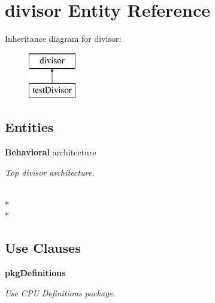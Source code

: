 \section{divisor Entity Reference}
\label{classdivisor}
Inheritance diagram for divisor\-:\begin{figure}[H]
\begin{center}
\leavevmode
\includegraphics[height=2.000000cm]{classdivisor}
\end{center}
\end{figure}
\subsection*{Entities}
\begin{DoxyCompactItemize}
\item 
{\bf Behavioral} architecture
\begin{DoxyCompactList}\small\item\em Top divisor architecture. \end{DoxyCompactList}\end{DoxyCompactItemize}
\\*
\\*
\subsection*{Use Clauses}
 \begin{DoxyCompactItemize}
\item 
{\bf pkg\-Definitions}   \label{classdivisor_ac442dca664056131bdaf5c92e4351e01}

\begin{DoxyCompactList}\small\item\em Use C\-P\-U Definitions package. \end{DoxyCompactList}\end{DoxyCompactItemize}

